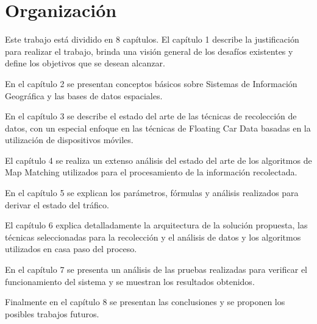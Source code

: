 \section{Organización}

Este trabajo está dividido en 8 capítulos. El capítulo 1 describe la justificación para realizar el trabajo, brinda una visión general de los desafíos existentes y define los objetivos que se desean alcanzar.

En el capítulo 2 se presentan conceptos básicos sobre Sistemas de Información Geográfica y las bases de datos espaciales.

En el capítulo 3 se describe el estado del arte de las técnicas de recolección de datos, con un especial enfoque en las técnicas de Floating Car Data basadas en la utilización de dispositivos móviles. 

El capítulo 4 se realiza un extenso análisis del estado del arte de los algoritmos de Map Matching utilizados para el procesamiento de la información recolectada.

En el capítulo 5 se explican los parámetros, fórmulas y análisis realizados para derivar el estado del tráfico.

El capítulo 6 explica detalladamente la arquitectura de la solución propuesta, las técnicas seleccionadas para la recolección y el análisis de datos y los algoritmos utilizados en casa paso del proceso.

En el capítulo 7 se presenta un análisis de las pruebas realizadas para verificar el funcionamiento del sistema y se muestran los resultados obtenidos.

Finalmente en el capítulo 8 se presentan las conclusiones y se proponen los posibles trabajos futuros.
